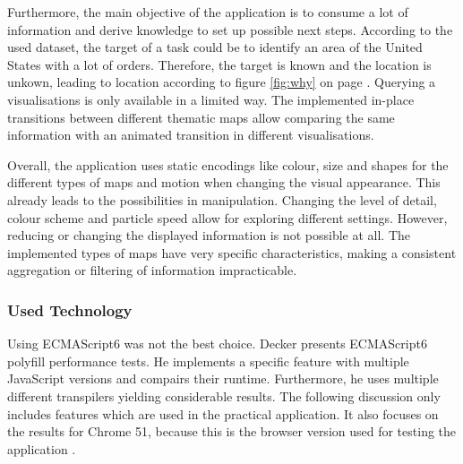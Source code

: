 Furthermore, the main objective of the application is to consume a lot of information and derive knowledge to set up possible next steps. According to the used dataset, the target of a task could be to identify an area of the United States with a lot of orders. Therefore, the target is known and the location is unkown, leading to location according to figure \ref{fig:why} on page \pageref{fig:why}. Querying a visualisations is only available in a limited way. The implemented in-place transitions between different thematic maps allow comparing the same information with an animated transition in different visualisations.

Overall, the application uses static encodings like colour, size and shapes for the different types of maps and motion when changing the visual appearance. This already leads to the possibilities in manipulation. Changing the level of detail, colour scheme and particle speed allow for exploring different settings. However, reducing or changing the displayed information is not possible at all. The implemented types of maps have very specific characteristics, making a consistent aggregation or filtering of information impracticable.

\subsubsection{Used Technology}
Using ECMAScript6 was not the best choice. Decker presents ECMAScript6 polyfill performance tests. He implements a specific feature with multiple JavaScript versions and compairs their runtime. Furthermore, he uses multiple different transpilers yielding considerable results. The following discussion only includes features which are used in the practical application. It also focuses on the results for Chrome 51, because this is the browser version used for testing the application .

